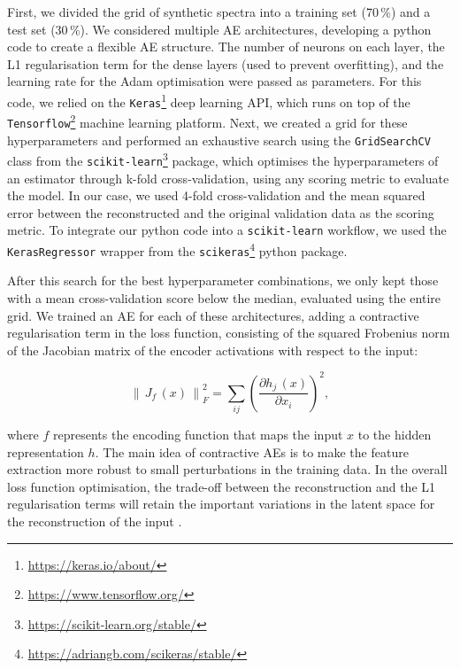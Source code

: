 First, we divided the grid of synthetic spectra into a training set (70\,\%) and a test set (30\,\%). We considered multiple AE architectures, developing a python code to create a flexible AE structure. The number of neurons on each layer, the L1 regularisation term for the dense layers (used to prevent overfitting), and the learning rate for the Adam optimisation \citep[a computationally efficient stochastic gradient descent method,][]{adam} were passed as parameters. For this code, we relied on the \texttt{Keras}\footnote{\url{https://keras.io/about/}} \citep{keras} deep learning API, which runs on top of the \texttt{Tensorflow}\footnote{\url{https://www.tensorflow.org/}} \citep{tensorflow} machine learning platform. Next, we created a grid for these hyperparameters and performed an exhaustive search using the \texttt{GridSearchCV} class from the \texttt{scikit-learn}\footnote{\url{https://scikit-learn.org/stable/}} package, which optimises the hyperparameters of an estimator through k-fold cross-validation, using any scoring metric to evaluate the model. In our case, we used 4-fold cross-validation and the mean squared error between the reconstructed and the original validation data as the scoring metric. To integrate our python code into a \texttt{scikit-learn} workflow, we used the \texttt{KerasRegressor} wrapper from the \texttt{scikeras}\footnote{\url{https://adriangb.com/scikeras/stable/}} python package.

After this search for the best hyperparameter combinations, we only kept those with a mean cross-validation score below the median, evaluated using the entire grid. We trained an AE for each of these architectures, adding a contractive regularisation term in the loss function, consisting of the squared Frobenius norm of the Jacobian matrix of the encoder activations with respect to the input:

\begin{equation}
    \left \|\,J_{f}\,(x)\, \right \|_{F}^{2}=\sum_{ij}\left ( \frac{\partial h_{j}\,(x)}{\partial x_i} \right)^2,
	\label{eq:contractive_loss}
\end{equation}

\noindent where $f$ represents the encoding function that maps the input $x$ to the hidden representation $h$. The main idea of contractive AEs is to make the feature extraction more robust to small perturbations in the training data. In the overall loss function optimisation, the trade-off between the reconstruction and the L1 regularisation terms will retain the important variations in the latent space for the reconstruction of the input \citep{rifai2011}.

